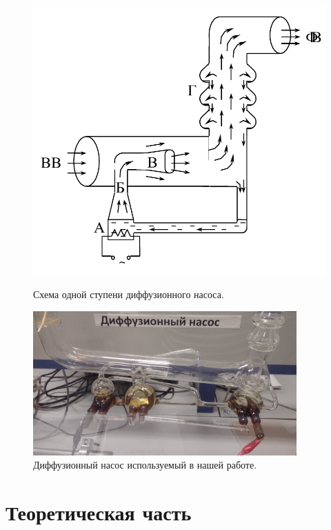 \documentclass[a4paper, 12pt]{article}
\begin{document}
    \begin{figure}[h]
    \centering
    \begin{minipage}{0.35\textwidth}
        \centering
        \includegraphics[width=1\textwidth]{diffuzionni_nasos}
        \caption{Схема одной ступени диффузионного насоса.}
        \label{ris:diffuzionni_nasos}
    \end{minipage}\hfill
    \begin{minipage}{0.65\textwidth}
        \centering
        \includegraphics[width=0.9\textwidth]{nasos_irl}
        \caption{Диффузионный насос используемый в нашей работе.}
        \label{ris:nasos_irl}
    \end{minipage}
    \end{figure}


    \section{Теоретическая часть}
\end{document}
